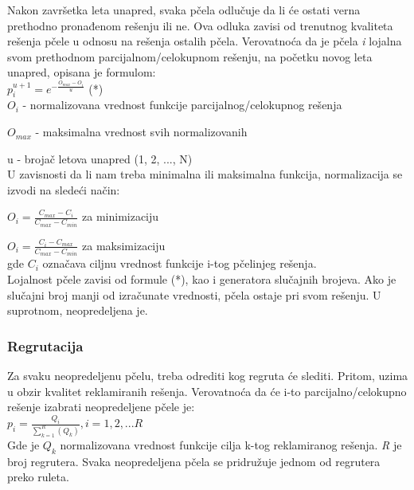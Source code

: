 \documentclass[a4paper]{article}
\begin{document}
{Nakon završetka leta unapred, svaka pčela odlučuje da li će ostati verna prethodno pronađenom rešenju ili ne. Ova odluka zavisi od trenutnog kvaliteta rešenja pčele u odnosu na rešenja ostalih pčela. Verovatnoća da je pčela {\em i} lojalna svom prethodnom parcijalnom/celokupnom rešenju, na početku novog leta unapred, opisana je formulom:\\

$p_i^{u+1}=e^{-\frac{O_{max}-O_i}{u}}$ \hfill (*)\\                             

$O_i$ - normalizovana vrednost funkcije parcijalnog/celokupnog rešenja
\item $O_{max}$ - maksimalna vrednost svih normalizovanih
\item u - brojač letova unapred (1, 2, ..., N)\\
     U zavisnosti da li nam treba minimalna ili maksimalna funkcija, normalizacija 
se izvodi na sledeći način:
\item$O_i=\frac{C_{max}-C_i}{C_{max}-C_{min}}$ za minimizaciju\\
\item$O_i=\frac{C_i-C_{max}}{C_{max}-C_{min}}$ za maksimizaciju\\
gde $C_i$ označava ciljnu vrednost funkcije i-tog pčelinjeg rešenja. \\

Lojalnost pčele zavisi od formule (*), kao i generatora slučajnih brojeva. Ako je slučajni broj manji od izračunate vrednosti, pčela ostaje pri svom rešenju. U suprotnom, neopredeljena je\cite{algoritam}.


\subsubsection{Regrutacija}
\label{subsubsec:regrutacija}

Za svaku neopredeljenu pčelu, treba odrediti kog regruta će slediti. Pritom, uzima u obzir kvalitet reklamiranih rešenja. Verovatnoća da će i-to parcijalno/celokupno rešenje izabrati neopredeljene pčele je: \\

$p_i = \frac{Q_i}{\sum_{k=1}^{R}(Q_k)},	i = 1, 2, . . . R$ \\

Gde je {\em $Q_k$} normalizovana vrednost funkcije cilja k-tog reklamiranog rešenja. {\em R} je broj regrutera. Svaka neopredeljena pčela se pridružuje jednom od regrutera preko ruleta\cite{bcoalg}.


}
\end{document}
